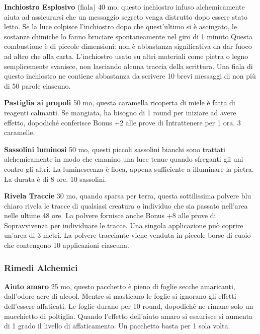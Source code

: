 \begin{multicols}{2}
\textbf{Inchiostro Esplosivo} (fiala) 40 mo, questo inchiostro infuso alchemicamente aiuta ad assicurarsi che un messaggio segreto venga distrutto dopo essere stato letto. Se la luce colpisce l'inchiostro dopo che quest'ultimo si è asciugato, le sostanze chimiche lo fanno bruciare spontaneamente nel giro di 1 minuto
Questa combustione è di piccole dimensioni: non è abbastanza significativa da dar fuoco ad altro che alla carta. L'inchiostro usato su altri materiali come pietra o legno semplicemente svanisce, non lasciando alcuna traccia della scrittura.
Una fiala di questo inchiostro ne contiene abbastanza da scrivere 10 brevi messaggi di non più di 50 parole ciascuno.


\textbf{Pastiglia ai propoli} 50 mo, questa caramella ricoperta di miele è fatta di reagenti calmanti. Se mangiata, ha bisogno di 1 round per iniziare ad avere effetto, dopodiché conferisce Bonus +2 alle prove di Intrattenere per 1 ora. 3 caramelle.

\textbf{Sassolini luminosi} 50 mo, questi piccoli sassolini bianchi sono trattati alchemicamente in modo che emanino una luce tenue quando sfreganti gli uni contro gli altri. La luminescenza è fioca, appena sufficiente a illuminare la pietra. La durata è di 8 ore. 10 sassolini.

\textbf{Rivela Traccie} 30 mo, quando sparsa per terra, questa sottilissima polvere blu chiaro rivela le tracce di qualsiasi creatura o individuo che sia passato nell'area nelle ultime 48 ore.
La polvere fornisce anche Bonus +8 alle prove di Sopravvivenza per individuare le tracce. Una singola applicazione può coprire un'area di 3 metri. La polvere tracciante viene venduta in piccole borse di cuoio che contengono 10 applicazioni ciascuna.

\subsubsection{Rimedi Alchemici}

\label{rimedi-alchemici}

\textbf{Aiuto amaro} 25 mo, questo pacchetto è pieno di foglie secche amaricanti, dall'odore acre di alcool. Mentre si masticano le foglie si ignorano gli effetti dell'essere affaticati. Le foglie durano per 10 round, dopodiché ne rimane solo un mucchietto di poltiglia.
Quando l'effetto dell'aiuto amaro si esaurisce si aumenta di 1 grado il livello di affaticamento. Un pacchetto basta per 1 sola volta.


\end{multicols}
